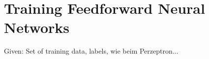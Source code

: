 \section{Training Feedforward Neural Networks}
\label{sec:training}
Given: Set of training data, labels, wie beim Perzeptron...